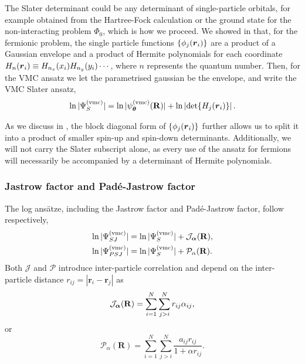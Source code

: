 The Slater determinant could be any determinant of single-particle orbitals, for example obtained from the Hartree-Fock calculation or the ground state for the non-interacting problem $\Phi_0$, which is how we proceed. We showed in  that, for the fermionic problem, the single particle functions $\{\phi_j(\boldsymbol{r}_i)\}$ are a product of a Gaussian envelope and a product of Hermite polynomials for each coordinate $H_{n}(\boldsymbol{r}_i) \equiv H_{n_x}(x_i)H_{n_y}(y_i)\cdots$, where $n$ represents the quantum number. Then, for the VMC ansatz we let the parametrised gaussian be the envelope, and write the VMC Slater ansatz,
\begin{align}
    \ln |\Psi^{(\text{vmc})}_{S}| = \ln|\psi^{(\text{vmc})}_{\boldsymbol{\theta}}(\mathbf{R})| + \ln\left|\det\{H_{j}(\boldsymbol{r}_i)\}\right| \label{eq:met:logs}.
\end{align} 

As we discuss in , the block diagonal form of $\{\phi_j(\boldsymbol{r}_i)\}$ further allows us to split it into a product of smaller spin-up and spin-down determinants. Additionally, we will not carry the Slater subscript alone, as every use of the ansatz for fermions will necessarily be accompanied by a determinant of Hermite polynomials.

\subsubsection{Jastrow factor and Padé-Jastrow factor}

The log ansätze, including the Jastrow factor and Padé-Jastrow factor, follow respectively,
\begin{align}
    \ln |\Psi^{(\text{vmc})}_{SJ}| &= \ln |\Psi^{(\text{vmc})}_{S}| + \mathcal{J}_{\boldsymbol{\alpha}}(\mathbf{R}) \label{eq:met:logsj},\\ 
    \ln |\Psi^{(\text{vmc})}_{PSJ}| &= \ln |\Psi^{(\text{vmc})}_{S}| + \mathcal{P}_{\alpha}(\mathbf{R}). \label{eq:met:logpsj}
\end{align}
Both $\mathcal{J}$ and $\mathcal{P}$ introduce inter-particle correlation and depend on the inter-particle distance $r_{ij} = |\mathbf{r}_i - \mathbf{r}_j|$ as
\begin{equation*}
\mathcal{J}_{\boldsymbol{\alpha}}(\mathbf{R}) =  \sum_{i=1}^{N} \sum_{j>i}^{N}  r_{ij}\alpha_{ij},
\end{equation*}
or
\begin{equation*}
\mathcal{P}_{\alpha}(\mathbf{R}) =  \sum_{i=1}^{N} \sum_{j>i}^{N} \frac{a_{ij} r_{ij}}{1 + \alpha r_{ij}}.
\end{equation*}

